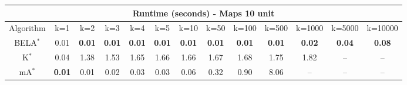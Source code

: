 \begin{tabular}{c|cccccccccccc}\toprule
\multicolumn{13}{c}{Runtime (seconds) - Maps 10 unit}\\ \midrule
Algorithm & k=1 & k=2 & k=3 & k=4 & k=5 & k=10 & k=50 & k=100 & k=500 & k=1000 & k=5000 & k=10000 \\ \midrule
BELA$^*$ & 0.01 & \textbf{0.01} & \textbf{0.01} & \textbf{0.01} & \textbf{0.01} & \textbf{0.01} & \textbf{0.01} & \textbf{0.01} & \textbf{0.01} & \textbf{0.02} & \textbf{0.04} & \textbf{0.08} \\
K$^*$ & 0.04 & 1.38 & 1.53 & 1.65 & 1.66 & 1.66 & 1.67 & 1.68 & 1.75 & 1.82 & -- & -- \\
mA$^*$ & \textbf{0.01} & 0.01 & 0.02 & 0.03 & 0.03 & 0.06 & 0.32 & 0.90 & 8.06 & -- & -- & -- \\ \bottomrule 
\end{tabular}
